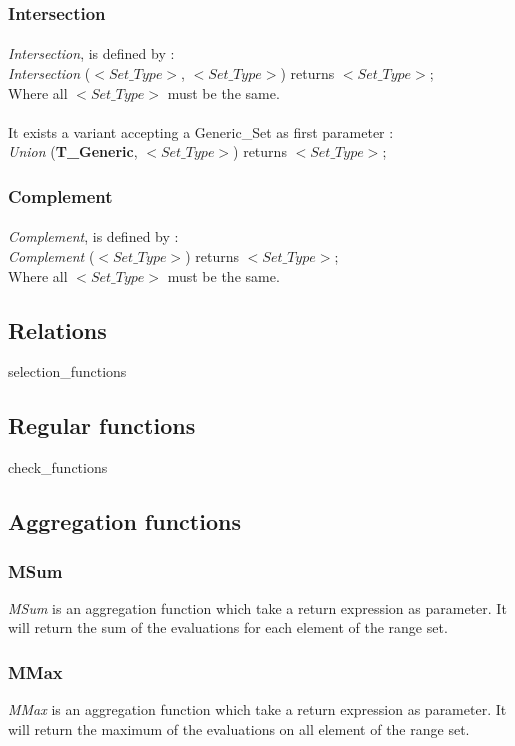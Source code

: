 \subsubsection {Intersection}

\paragraph{}
\textit{Intersection}, is defined by :\\ 
\textit{Intersection} ($<Set\_Type>$, $<Set\_Type>$) returns $<Set\_Type>$;\\
Where all $<Set\_Type>$ must be the same.

\paragraph{}
It exists a variant accepting a Generic\_Set as first parameter :\\
\textit{Union} (\textbf{T\_Generic}, $<Set\_Type>$) returns $<Set\_Type>$;

\subsubsection {Complement}

\paragraph{}
\textit{Complement}, is defined by :\\ 
\textit{Complement} ($<Set\_Type>$) returns $<Set\_Type>$;\\
Where all $<Set\_Type>$ must be the same.

\subsection {Relations}
 {selection_functions}

\subsection {Regular functions}
 {check_functions}

\subsection {Aggregation functions}

\subsubsection {MSum}

\textit {MSum} is an aggregation function which take a return expression
as parameter. It will return the sum of the evaluations for each element 
of the range set.

\subsubsection {MMax}

\textit {MMax} is an aggregation function which take a return expression
as parameter. It will return the maximum of the evaluations on all element 
of the range set.

